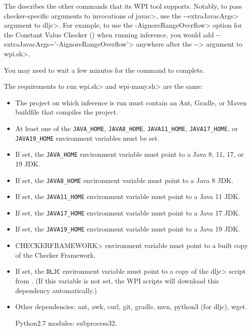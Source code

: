 \begin{description}
  The 
  describes the other commands that its WPI tool supports. Notably, to pass checker-specific
  arguments to invocations of \<javac>,
  use the \<-\relax-extraJavacArgs> argument to \<dljc>. For example, to use the \<-AignoreRangeOverflow>
  option for the Constant Value Checker () when running
  inference, you would add \<-\relax-extraJavacArgs='-AignoreRangeOverflow'> anywhere after the \<-\relax->
  argument to \<wpi.sh>.
\end{description}

You may need to wait a few minutes for the command to complete.



The requirements to run \<wpi.sh> and \<wpi-many.sh> are the same:

\begin{itemize}
\item The project on which inference is run must contain an Ant, Gradle,
  or Maven buildfile that compiles the project.
\item At least one of the \verb|JAVA_HOME|,
  \verb|JAVA8_HOME|, \verb|JAVA11_HOME|, \verb|JAVA17_HOME|, or \verb|JAVA19_HOME|
  environment variables must be set.
\item If set, the \verb|JAVA_HOME| environment variable must point to a
  Java 8, 11, 17, or 19 JDK.
\item If set, the \verb|JAVA8_HOME| environment variable must point to a Java 8 JDK.
\item If set, the \verb|JAVA11_HOME| environment variable must point to a Java 11 JDK.
\item If set, the \verb|JAVA17_HOME| environment variable must point to a Java 17 JDK.
\item If set, the \verb|JAVA19_HOME| environment variable must point to a Java 19 JDK.
\item \<CHECKERFRAMEWORK> environment variable must point to a built copy of the Checker Framework.
\item If set, the \verb|DLJC| environment variable must point to a copy of the \<dljc> script
from . (If this variable is not
set, the WPI scripts will download this dependency automatically.)
\item Other dependencies:
  ant,
  awk,
  curl,
  git,
  gradle,
  mvn,
  python3 (for dljc),
  wget.

  Python2.7 modules:
  subprocess32.
\end{itemize}



